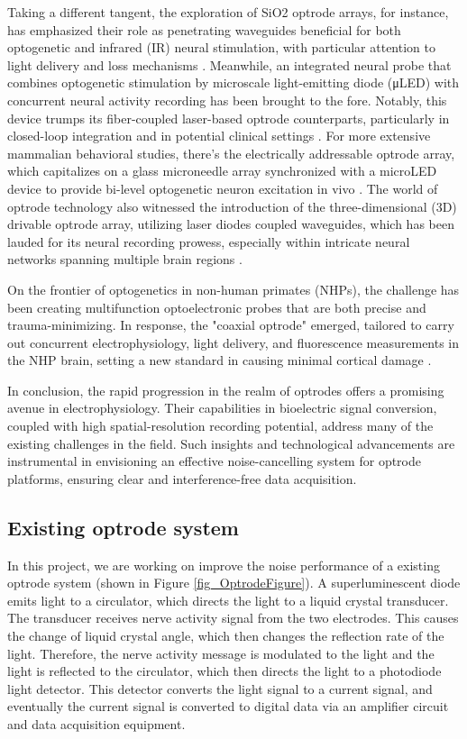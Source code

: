 Taking a different tangent, the exploration of SiO2 optrode arrays, for instance, has emphasized their role as penetrating waveguides beneficial for both optogenetic and infrared (IR) neural stimulation, with particular attention to light delivery and loss mechanisms \cite{MoreOptrode_1}.  Meanwhile, an integrated neural probe that combines optogenetic stimulation by microscale light-emitting diode (μLED) with concurrent neural activity recording has been brought to the fore. Notably, this device trumps its fiber-coupled laser-based optrode counterparts, particularly in closed-loop integration and in potential clinical settings \cite{MoreOptrode_2}. For more extensive mammalian behavioral studies, there's the electrically addressable optrode array, which capitalizes on a glass microneedle array synchronized with a microLED device to provide bi-level optogenetic neuron excitation in vivo \cite{MoreOptrode_3}. The world of optrode technology also witnessed the introduction of the three-dimensional (3D) drivable optrode array, utilizing laser diodes coupled waveguides, which has been lauded for its neural recording prowess, especially within intricate neural networks spanning multiple brain regions \cite{MoreOptrode_4}.

On the frontier of optogenetics in non-human primates (NHPs), the challenge has been creating multifunction optoelectronic probes that are both precise and trauma-minimizing. In response, the "coaxial optrode" emerged, tailored to carry out concurrent electrophysiology, light delivery, and fluorescence measurements in the NHP brain, setting a new standard in causing minimal cortical damage \cite{MoreOptrode_5}.

In conclusion, the rapid progression in the realm of optrodes offers a promising avenue in electrophysiology. Their capabilities in bioelectric signal conversion, coupled with high spatial-resolution recording potential, address many of the existing challenges in the field. Such insights and technological advancements are instrumental in envisioning an effective noise-cancelling system for optrode platforms, ensuring clear and interference-free data acquisition.

\subsection{Existing optrode system}
In this project, we are working on improve the noise performance of a existing optrode system \cite{OptrodeProceesings} (shown in Figure \ref{fig_OptrodeFigure}).  A superluminescent diode emits light to a circulator, which directs the light to a liquid crystal transducer.  The transducer receives nerve activity signal from the two electrodes.  This causes the change of liquid crystal angle, which then changes the reflection rate of the light.  Therefore, the nerve activity message is modulated to the light and the light is reflected to the circulator, which then directs the light to a photodiode light detector.  This detector converts the light signal to a current signal, and eventually the current signal is converted to digital data via an amplifier circuit and data acquisition equipment. 

